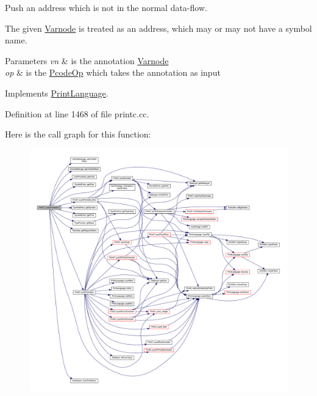 Push an address which is not in the normal data-\/flow. 

The given \mbox{\hyperlink{class_varnode}{Varnode}} is treated as an address, which may or may not have a symbol name. 
\begin{DoxyParams}{Parameters}
{\em vn} & is the annotation \mbox{\hyperlink{class_varnode}{Varnode}} \\
\hline
{\em op} & is the \mbox{\hyperlink{class_pcode_op}{Pcode\+Op}} which takes the annotation as input \\
\hline
\end{DoxyParams}


Implements \mbox{\hyperlink{class_print_language_a08b82dcc9073756390dbee98a85d9a95}{Print\+Language}}.



Definition at line 1468 of file printc.\+cc.

Here is the call graph for this function\+:
\nopagebreak
\begin{figure}[H]
\begin{center}
\leavevmode
\includegraphics[width=350pt]{class_print_c_a234b95d9f3fdb8a79eeff02eb4acbca3_cgraph}
\end{center}
\end{figure}
\mbox{\label{class_print_c_a735ddb9bb724110dbd9d1e3b5e381b6d}} 

